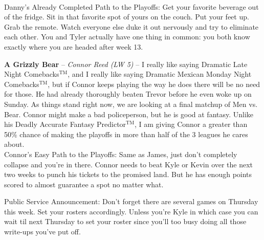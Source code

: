 \documentclass[11pt,letterpaper]{article}
\begin{document}
\begin{etaremune}
\medskip\\Danny's Already Completed Path to the Playoffs: Get your favorite beverage out of the fridge. Sit in that favorite spot of yours on the couch. Put your feet up. Grab the remote. Watch everyone else duke it out nervously and try to eliminate each other. You and Tyler actually have one thing in common: you both know exactly where you are headed after week 13.  
\item \textbf{A Grizzly Bear} -- \textit{Connor Reed (LW 5)} -- I really like saying Dramatic Late Night Comebacks$^\text{TM}$, and I really like saying Dramatic Mexican Monday Night Comebacks$^\text{TM}$, but if Connor keeps playing the way he does there will be no need for those. He had already thoroughly beaten Trevor before he even woke up on Sunday. As things stand right now, we are looking at a final matchup of Men vs. Bear. Connor might make a bad policeperson, but he is good at fantasy. Unlike his Deadly Accurate Fantasy Predictor$^\text{TM}$, I am giving Connor a greater than 50\% chance of making the playoffs in more than half of the 3 leagues he cares about. 
\medskip\\Connor's Easy Path to the Playoffs: Same as James, just don't completely collapse and you're in there. Connor needs to beat Kyle or Kevin over the next two weeks to punch his tickets to the promised land. But he has enough points scored to almost guarantee a spot no matter what. 
\end{etaremune}
Public Service Announcement: Don't forget there are several games on Thursday this week. Set your rosters accordingly. Unless you're Kyle in which case you can wait til next Thursday to set your roster since you'll too busy doing all those write-ups you've put off. 
\end{document}
